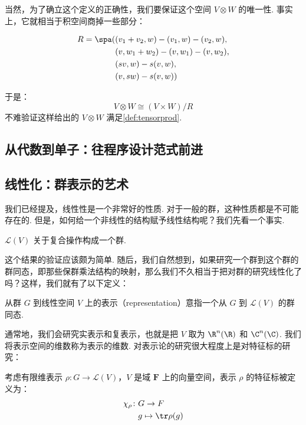 当然，为了确立这个定义的正确性，我们要保证这个空间 $V \otimes W$ 的唯一性. 事实上，它就相当于积空间商掉一些部分：

\begin{align*}
    R = \spa ( & (v_1 + v_2, w) - (v_1, w) - (v_2, w), \\
               & (v, w_1 + w_2) - (v, w_1) - (v, w_2), \\
               & (sv, w) - s(v, w),                    \\
               & (v, sw) - s(v, w))
\end{align*}

于是：
\[ V \otimes W \cong (V \times W) / R \]
不难验证这样给出的 $V \otimes W$ 满足\autoref{def:tensorprod}.

\subsection{从代数到单子：往程序设计范式前进}

\subsection{线性化：群表示的艺术}

我们已经提及，线性性是一个非常好的性质. 对于一般的群，这种性质都是不可能存在的. 但是，如何给一个非线性的结构赋予线性结构呢？我们先看一个事实.

\begin{lemma}{}{}
    $\mathcal{L}(V)$ 关于复合操作构成一个群.
\end{lemma}

这个结果的验证应该颇为简单. 随后，我们自然想到，如果研究一个群到这个群的群同态，即那些保群乘法结构的映射，那么我们不久相当于把对群的研究线性化了吗？这样，我们就有了以下定义：

\begin{definition}{}{}
    从群 $G$ 到线性空间 $V$ 上的表示（representation）意指一个从 $G$ 到 $\mathcal{L}(V)$ 的群同态.
\end{definition}

通常地，我们会研究实表示和复表示，也就是把 $V$ 取为 $\R^n(\R)$ 和 $\C^n(\C)$. 我们将表示空间的维数称为表示的维数. 对表示论的研究很大程度上是对特征标的研究：

\begin{definition}{}{}
    考虑有限维表示 $\rho: G \to \mathcal{L}(V)$，$V$ 是域 $\mathbf{F}$ 上的向量空间，表示 $\rho$ 的特征标被定义为：
    \begin{align*}
        \chi_\rho \colon & G \to F                 \\
                         & g  \mapsto  \tr \rho(g)
    \end{align*}
\end{definition}

